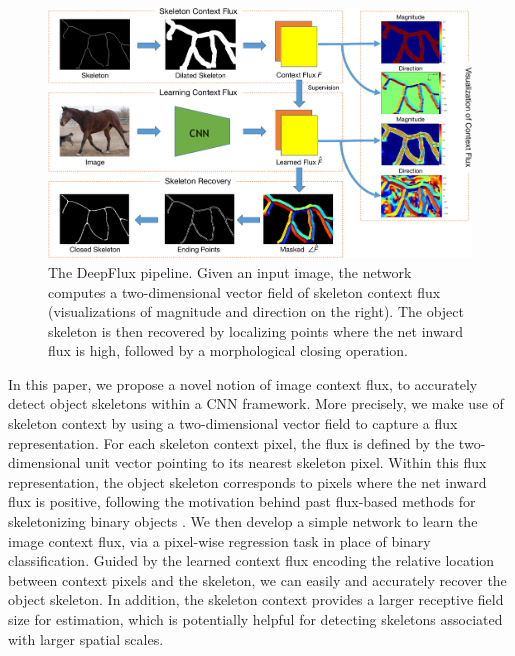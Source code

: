 \documentclass[10pt,twocolumn,letterpaper]{article}
\begin{document}

\begin{figure}
\centering
\includegraphics[width=0.90\linewidth]{figures/pipeline_crop.pdf}
\vskip 0.4cm
\caption{The DeepFlux pipeline. Given an input image, the network computes a two-dimensional vector field of skeleton context flux (visualizations of magnitude and direction on the right). The object skeleton is then recovered by localizing points where the net inward flux is high, followed by a morphological closing operation.}
\label{fig:pipeline}
\end{figure}


In this paper, we propose a novel notion of image context flux, to accurately detect object skeletons within a CNN framework. More precisely, we make use of skeleton context by using a two-dimensional vector field to capture a flux representation. For each skeleton context pixel, the flux is defined by the two-dimensional unit vector pointing to its nearest skeleton pixel. Within this flux representation, the object skeleton corresponds to pixels where the net inward flux is positive, following the motivation behind past flux-based methods for skeletonizing binary objects \cite{siddiqi2002hamilton,dimitrov2003}. We then develop a simple network to learn the image context flux, via a pixel-wise regression task in place of binary classification. Guided by the learned context flux encoding the relative location between context pixels and the skeleton, we can easily and accurately recover the object skeleton. In addition, the skeleton context provides a larger receptive field size for estimation, which is potentially helpful for detecting skeletons associated with larger spatial scales.
\end{document}
